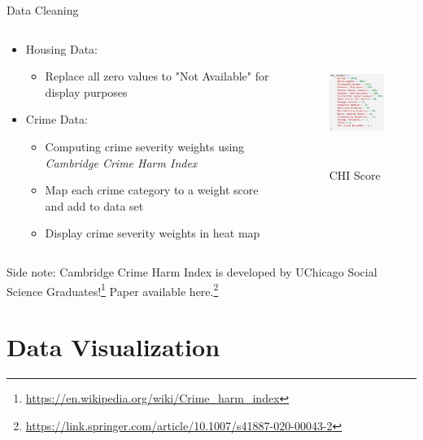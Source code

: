 \documentclass{beamer}
\begin{document}
\begin{frame}{Data Cleaning}
    \begin{columns}
        \begin{column}{0.65\textwidth}
            \begin{itemize}
        \item Housing Data:
        \begin{itemize}
            \item Replace all zero values to "Not Available" for display purposes
        \end{itemize}
        \item Crime Data:
        \begin{itemize}
            \item Computing crime severity weights using \textit{Cambridge Crime Harm Index}
            \item Map each crime category to a weight score and add to data set
            \item Display crime severity weights in heat map
        \end{itemize}
    \end{itemize}
        \end{column}
        
    \begin{column}{0.35\textwidth}
        \begin{figure}[H]
			\centering
			\includegraphics[height=4cm, width=3.5cm]{figs/chi_scores.png}
			\caption{CHI Score}
			\end{figure}
    \end{column}
    \end{columns}
    
    Side note: Cambridge Crime Harm Index is developed by UChicago Social Science Graduates!\footnote{\url{https://en.wikipedia.org/wiki/Crime_harm_index}} Paper available here.\footnote{\url{https://link.springer.com/article/10.1007/s41887-020-00043-2}}
\end{frame}



\section{Data Visualization}
\end{document}
